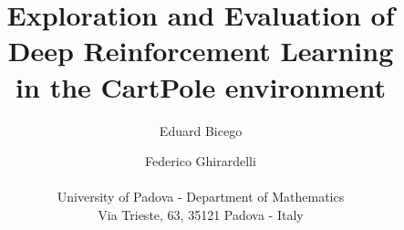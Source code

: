 \documentclass[letterpaper]{article} %
\begin{document}
%
\title{Exploration and Evaluation of Deep Reinforcement Learning \\ in the CartPole environment}

\author{Eduard Bicego \and Federico Ghirardelli \\\\
University of Padova - Department of Mathematics\\
Via Trieste, 63, 35121 Padova - Italy\\
}

\nocopyright

\maketitle













\end{document}
